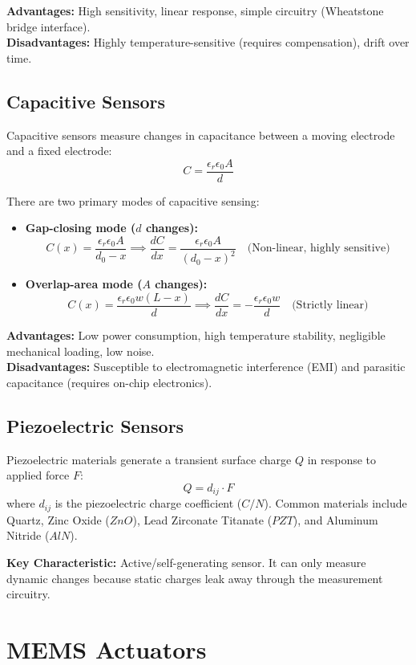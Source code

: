\documentclass[12pt,a4paper]{article}
\begin{document}
\textbf{Advantages:} High sensitivity, linear response, simple circuitry (Wheatstone bridge interface). \\
\textbf{Disadvantages:} Highly temperature-sensitive (requires compensation), drift over time.

\subsection{Capacitive Sensors}
Capacitive sensors measure changes in capacitance between a moving electrode and a fixed electrode:
$$C = \frac{\epsilon_r \epsilon_0 A}{d}$$

There are two primary modes of capacitive sensing:
\begin{itemize}[leftmargin=*, itemsep=4pt]
  \item \textbf{Gap-closing mode ($d$ changes):}
  $$C(x) = \frac{\epsilon_r \epsilon_0 A}{d_0 - x} \implies \frac{dC}{dx} = \frac{\epsilon_r \epsilon_0 A}{(d_0 - x)^2} \quad \text{(Non-linear, highly sensitive)}$$
  \item \textbf{Overlap-area mode ($A$ changes):}
  $$C(x) = \frac{\epsilon_r \epsilon_0 w (L - x)}{d} \implies \frac{dC}{dx} = -\frac{\epsilon_r \epsilon_0 w}{d} \quad \text{(Strictly linear)}$$
\end{itemize}

\textbf{Advantages:} Low power consumption, high temperature stability, negligible mechanical loading, low noise. \\
\textbf{Disadvantages:} Susceptible to electromagnetic interference (EMI) and parasitic capacitance (requires on-chip electronics).

\subsection{Piezoelectric Sensors}
Piezoelectric materials generate a transient surface charge $Q$ in response to applied force $F$:
$$Q = d_{ij} \cdot F$$
where $d_{ij}$ is the piezoelectric charge coefficient ($C/N$). Common materials include Quartz, Zinc Oxide ($ZnO$), Lead Zirconate Titanate ($PZT$), and Aluminum Nitride ($AlN$).

\textbf{Key Characteristic:} Active/self-generating sensor. It can only measure dynamic changes because static charges leak away through the measurement circuitry.

\section{MEMS Actuators}
\end{document}
